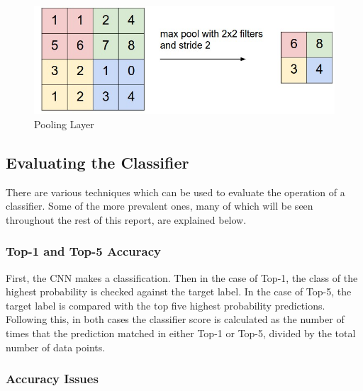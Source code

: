 \documentclass[12pt]{report}
\begin{document}
\vspace{0.5cm}
\begin{figure}[h]
	\centering
	\includegraphics[width=12cm]{pool}
	\caption{Pooling Layer}
	\label{fig:pool}
\end{figure}

\newpage
\subsection{Evaluating the Classifier}
\begin{flushleft}
There are various techniques which can be used to evaluate the operation of a classifier. Some of the more prevalent ones, many of which will be seen throughout the rest of this report, are explained below.
\end{flushleft}

\subsubsection{Top-1 and Top-5 Accuracy}
\begin{flushleft}
First, the CNN makes a classification. Then in the case of Top-1, the class of the highest probability is checked against the target label. In the case of Top-5, the target label is compared with the top five highest probability predictions. Following this, in both cases the classifier score is calculated as the number of times that the prediction matched in either Top-1 or Top-5, divided by the total number of data points.
\end{flushleft}

\subsubsection{Accuracy Issues}
\end{document}

